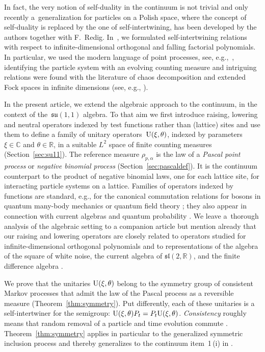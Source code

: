 \documentclass[pdftex]{sigma}
\numberwithin{equation}{section}
\newcommand{\R}{\mathbb{R}}
\newcommand{\C}{\mathbb{C}}
\newcommand{\1}{\mathbbm{1}}
\begin{document}
In fact, the very notion of self-duality in the continuum is not trivial and only recently a~generalization for particles on a Polish space, where the concept of self-duality is replaced by the one of self-intertwining, has been developed by the authors together with F.~Redig.
In~\cite{IntertwiningConsistent}, we formulated self-intertwining relations with respect to infinite-dimensional orthogonal and falling factorial polynomials. In particular, we used the modern language of point processes, see, e.g.,~\cite{last2016}, identifying the particle system with an evolving counting measure and intriguing relations were found with the literature of chaos decomposition and extended Fock spaces in infinite dimensions (see, e.g., \cite{lytvynov2003JFA}).

In the present article, we extend the algebraic approach to the continuum, in the context of the~$\mathfrak{su}(1,1)$ algebra. To that aim we first introduce raising, lowering and neutral operators indexed by test functions rather than (lattice) sites and use them to define a family of unitary operators~${\rm U}(\xi,\theta)$, indexed by parameters $\xi\in \C$ and $\theta \in \R$, in a suitable $L^2$ space of finite counting measures (Section~\ref{sec:su11}). The reference measure $\rho_{p,\alpha}$ is the law of a \emph{Pascal point process} or \emph{negative binomial process} (Section~\ref{sec:pascaldef}). It is the continuum counterpart to the product of negative binomial laws, one for each lattice site, for interacting particle systems on a lattice. Families of operators indexed by functions are standard, e.g., for the canonical commutation relations for bosons in quantum many-body mechanics or quantum field theory \cite[Section~X.7]{reedSimonII}; they also appear in connection with current algebras and quantum probability \cite{accardi2009quantum,araki1969}. We leave a~thorough analysis of the algebraic setting to a companion article \cite{algebraic_Floreani} but mention already that our raising and lowering operators are closely related to operators studied for infinite-dimensional orthogonal polynomials \cite{lytvynov2003JFA} and to representations of the algebra of the square of white noise, the current algebra of $\mathfrak{sl}(2,\R)$,
and the finite difference algebra \cite{accardi2002renormalized,boukas1991,sniady2000}.

We prove that the unitaries ${\rm U}(\xi,\theta)$ belong to the symmetry group of consistent Markov processes that admit the law of the Pascal process as a reversible measure (Theorem~\ref{thm:symmetry}). Put differently, each of these unitaries is a self-intertwiner for the semigroup: ${\rm U}(\xi,\theta) P_t = P_t {\rm U}(\xi,\theta)$. \emph{Consistency} roughly means that random removal of a particle and time evolution commute \cite{carinci2021consistent}. Theorem~\ref{thm:symmetry} applies in particular to the generalized symmetric inclusion process and thereby generalizes to the continuum item~1\,(i) in \cite[Theorem~3.1]{carinci2019orthogonal}.
\end{document}

